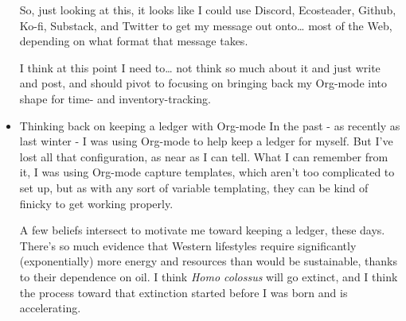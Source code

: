 \documentclass[11pt]{article}
\begin{document}
\begin{itemize}

So, just looking at this, it looks like I could use Discord, Ecosteader, Github, Ko-fi, Substack, and Twitter to get my message out onto\ldots{} most of the Web, depending on what format that message takes.

I think at this point I need to\ldots{} not think so much about it and just write and post, and should pivot to focusing on bringing back my Org-mode into shape for time- and inventory-tracking.
\item Thinking back on keeping a ledger with Org-mode
\label{sec:org103b89c}
In the past - as recently as last winter - I was using Org-mode to help keep a ledger for myself. But I've lost all that configuration, as near as I can tell. What I can remember from it, I was using Org-mode capture templates, which aren't too complicated to set up, but as with any sort of variable templating, they can be kind of finicky to get working properly.

A few beliefs intersect to motivate me toward keeping a ledger, these days. There's so much evidence that Western lifestyles require significantly (exponentially) more energy and resources than would be sustainable, thanks to their dependence on oil. I think \emph{Homo colossus} will go extinct, and I think the process toward that extinction started before I was born and is accelerating.


\end{itemize}
\end{document}
